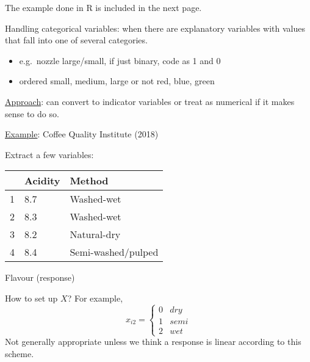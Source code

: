The example done in R is included in the next page.


Handling categorical variables: when there are explanatory
variables with values that fall into one of
several categories.
\begin{itemize}
    \item e.g.\ nozzle large/small, if just binary,
          code as 1 and 0
    \item ordered small, medium, large or not
          red, blue, green
\end{itemize}
\underline{Approach}: can convert to indicator variables
or treat as numerical if it makes sense to do so.

\underline{Example}: Coffee Quality Institute (2018)

Extract a few variables:
\begin{table}[H]
    \centering
    \begin{tabularx}{0.7\linewidth}{@{}YYY@{}}
          & Acidity & Method             \\
         & 8.7     & Washed-wet         \\
        2 & 8.3     & Washed-wet         \\
        3 & 8.2     & Natural-dry        \\
        4 & 8.4     & Semi-washed/pulped
    \end{tabularx}
\end{table}
Flavour (response)

How to set up $ X $? For example,
\[ x_{i2}=\begin{cases*}
        0 & dry\\
        1 & semi\\
        2 & wet
    \end{cases*} \]
Not generally appropriate unless we think
a response is linear according to this scheme.

